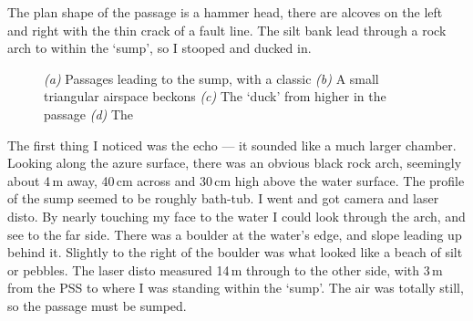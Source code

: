 The plan shape of the passage is a hammer head, there are alcoves on the left and right with the thin crack of a fault line. The silt bank lead through a rock arch to within the `sump', so I stooped and ducked in.
\begin{figure}[t]
\checkoddpage \ifoddpage \forcerectofloat \else \forceversofloat \fi
    \centering
    \begin{subfigure}[t]{0.345\textwidth}
    \centering
        \caption{} \label{Hourglass passage}
    \end{subfigure}
        \hfill
        \begin{subfigure}[t]{0.615\textwidth}
        \centering
        \caption{} \label{Colorado Duck}
    \end{subfigure}
          \vspace{0cm}
          
    \begin{subfigure}[t]{0.615\textwidth}
        \centering
        \caption{} \label{Colarado Sump}
    \end{subfigure}
    \hfill
    \begin{subfigure}[t]{0.345\textwidth}
\centering
{}
\label{Rock of Sages}
\end{subfigure}
    \caption{
    \textit{(a)} Passages leading to the sump, with a classic  
    \textit{(b)} A small triangular airspace beckons
    \textit{(c)}  The \protect{} `duck' from higher in the passage
    \textit{(d)} The \protect{} }
\end{figure}

The first thing I noticed was the echo --- it sounded like a much larger chamber. Looking along the azure surface, there was an obvious black rock arch, seemingly about 4\,m away, 40\,cm across and 30\,cm high above the water surface. The profile of the sump seemed to be roughly bath-tub.
I went and got camera and laser disto. By nearly touching my face to the water I could look through the arch, and see to the far side. There was a boulder at the water's edge, and slope leading up behind it. Slightly to the right of the boulder was what looked like a beach of silt or pebbles. The laser disto measured 14\,m through to the other side, with 3\,m from the PSS to where I was standing within the `sump'. The air was totally still, so the passage must be sumped.

